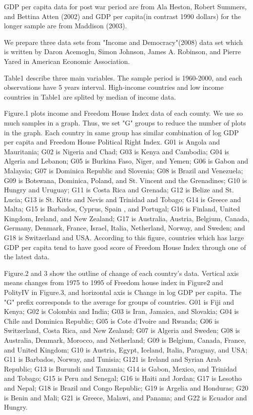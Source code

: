 GDP per capita data for post war period are from Ala Heston, Robert Summers, and Bettina Atten (2002) and GDP per capita(in contrast 1990 dollars) for the longer sample are from Maddison (2003).


We prepare three data sets from "Income and Democracy"(2008) data set which is written by Daron Acemoglu, Simon Johnson, James A. Robinson, and Pierre Yared in American Economic Association.

Table1 describe three main variables. The sample period is 1960-2000, and each observations have 5 years interval. High-income countries and low income countries in Table1 are splited by median of income data.

Figure.1 plots income and Freedom House Index data of each county. We use so much samples in a graph. Thus, we set "G" groups to reduce the number of plots in the graph. Each country in same group has similar combination of log GDP per capita and Freedom House Political Right Index. G01 is Angola and Mauritania; G02 is Nigeria and Chad; G03 is Kenya and Cambodia; G04 is Algeria and Lebanon; G05 is Burkina Faso, Niger, and Yemen; G06 is Gabon and Malaysia; G07 is Dominica Republic and Slovenia; G08 is Brazil and Venezuela; G09 is Botswana, Dominica, Poland, and St. Vincent and the Grenadines; G10 is Hungry and Uruguay; G11 is Costa Rica and Grenada; G12 is Belize and St. Lucia; G13 is St. Kitts and Nevis and Trinidad and Tobago; G14 is Greece and Malta; G15 is Barbados, Cyprus, Spain , and Portugal; G16 is Finland, United Kingdom, Ireland, and New Zealand; G17 is Australia, Austria, Belgium, Canada, Germany, Denmark, France, Israel, Italia, Netherland, Norway, and Sweden; and G18 is Switzerland and USA. According to this figure, countries which has large GDP per capita tend to have good score of Freedom House Index through one of the latest data.


Figure.2 and 3 show the outline of change of each country’s data. Vertical axis means changes from 1975 to 1995 of Freedom house index in Figure2 and PolityI\hspace{-.1em}V in Figure.3, and horizontal axis is Change in log GDP per capita. The "G" prefix corresponds to the average for groups of countries. G01 is Fiji and Kenya; G02 is Colombia and India; G03 is Iran, Jamaica, and Slovakia; G04 is Chile and Dominica Republic; G05 is Cote d’Ivoire and Rwanda; G06 is Switzerland, Costa Rica, and New Zealand; G07 is Algeria and Sweden; G08 is Australia, Denmark, Morocco, and Netherland; G09 is Belgium, Canada, France, and United Kingdom; G10 is Austria, Egypt, Iceland, Italia, Paraguay, and USA; G11 is Barbados, Norway, and Tunisia; G121 is Ireland and Syrian Arab Republic; G13 is Burundi and Tanzania; G14 is Gabon, Mexico, and Trinidad and Tobago; G15 is Peru and Senegal; G16 is Haiti and Jordan; G17 is Lesotho and Nepal; G18 is Brazil and Congo Republic; G19 is Argelia and Honduras; G20 is Benin and Mali; G21 is Greece, Malawi, and Panama; and G22 is Ecuador and Hungry.


